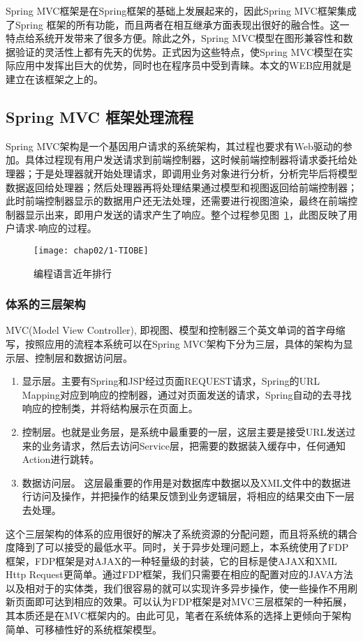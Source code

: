 Spring MVC框架是在Spring框架的基础上发展起来的，因此Spring MVC框架集成了Spring 框架的所有功能，而且两者在相互继承方面表现出很好的融合性。这一特点给系统开发带来了很多方便。除此之外，Spring MVC模型在图形兼容性和数据验证的灵活性上都有先天的优势。正式因为这些特点，使Spring MVC模型在实际应用中发挥出巨大的优势，同时也在程序员中受到青睐。本文的WEB应用就是建立在该框架之上的。
\subsection{Spring MVC 框架处理流程}
Spring MVC架构是一个基因用户请求的系统架构，其过程也要求有Web驱动的参加。具体过程现有用户发送请求到前端控制器，这时候前端控制器将请求委托给处理器；于是处理器就开始处理请求，即调用业务对象进行分析，分析完毕后将模型数据返回给处理器；然后处理器再将处理结果通过模型和视图返回给前端控制器；此时前端控制器显示的数据用户还无法处理，还需要进行视图渲染，最终在前端控制器显示出来，即用户发送的请求产生了响应。整个过程参见图~\ref{fig:mvc}，此图反映了用户请求-响应的过程。
\begin{figure}[H] %
  \centering
  \texttt{[image: chap02/1-TIOBE]}
  \caption{编程语言近年排行}
  \label{fig:mvc}
\end{figure}
\subsubsection{体系的三层架构}
MVC(Model View Controller), 即视图、模型和控制器三个英文单词的首字母缩写，按照应用的流程本系统可以在Spring MVC架构下分为三层，具体的架构为显示层、控制层和数据访问层。

\begin{enumerate}
\item 显示层。主要有Spring和JSP经过页面REQUEST请求，Spring的URL Mapping对应到响应的控制器，通过对页面发送的请求，Spring自动的去寻找响应的控制类，并将结构展示在页面上。

\item 控制层。也就是业务层，是系统中最重要的一层，这层主要是接受URL发送过来的业务请求，然后去访问Service层，把需要的数据装入缓存中，任何通知Action进行跳转。

\item 数据访问层。 这层最重要的作用是对数据库中数据以及XML文件中的数据进行访问及操作，并把操作的结果反馈到业务逻辑层，将相应的结果交由下一层去处理。
\end{enumerate}
这个三层架构的体系的应用很好的解决了系统资源的分配问题，而且将系统的耦合度降到了可以接受的最低水平。同时，关于异步处理问题上，本系统使用了FDP框架，FDP框架是对AJAX的一种轻量级的封装，它的目标是使AJAX和XML Http Request更简单。通过FDP框架，我们只需要在相应的配置对应的JAVA方法以及相对于的实体类，我们很容易的就可以实现许多异步操作，使一些操作不用刷新页面即可达到相应的效果。可以认为FDP框架是对MVC三层框架的一种拓展，其本质还是在MVC框架内的。由此可见，笔者在系统体系的选择上更倾向于架构简单、可移植性好的系统框架模型。
